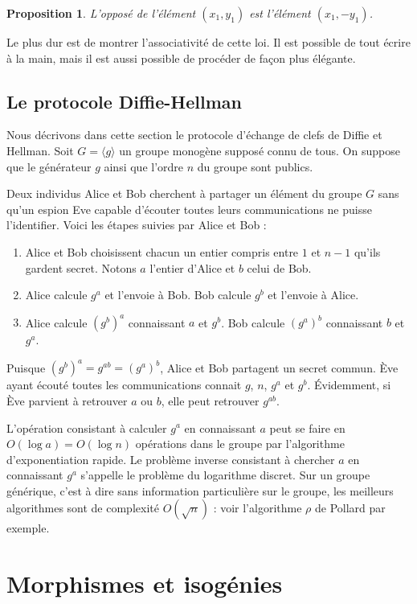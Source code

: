 \documentclass{article}
\theoremstyle{plain}%
\newtheorem{prop}[thm]{Proposition}
\theoremstyle{definition}%
\begin{document}
\begin{prop}
  \label{opposé}
L'opposé de l'élément $(x_1, y_1)$ est l'élément $(x_1, -y_1)$.
\end{prop}

Le plus dur est de montrer l'associativité de cette loi. Il est possible de tout écrire à la main, mais il est aussi possible de procéder de façon plus élégante.


\subsection{Le protocole Diffie-Hellman}


Nous décrivons dans cette section le protocole d'échange de clefs de Diffie et Hellman. 
Soit $G = \langle g \rangle$ un groupe monogène supposé connu de tous. On suppose que le générateur $g$ ainsi que l'ordre $n$ du groupe sont publics.

Deux individus Alice et Bob cherchent à partager un élément du groupe $G$ sans qu'un espion Eve capable d'écouter toutes leurs communications ne puisse l'identifier. Voici les étapes suivies par Alice et Bob :
\begin{enumerate}
  \item Alice et Bob choisissent chacun un entier compris entre $1$ et $n-1$ qu'ils gardent secret. Notons $a$ l'entier d'Alice et $b$ celui de Bob.
  \item Alice calcule $g^a$ et l'envoie à Bob. Bob calcule $g^b$ et l'envoie à Alice.
  \item Alice calcule $(g^b)^a$ connaissant $a$ et $g^b$. Bob calcule $(g^a)^b$ connaissant $b$ et $g^a$.
\end{enumerate}
Puisque $(g^b)^a = g^{ab} = (g^a)^b$, Alice et Bob partagent un secret commun. Ève ayant écouté toutes les communications connait $g$, $n$, $g^a$ et $g^b$. Évidemment, si Ève parvient à retrouver $a$ ou $b$, elle peut retrouver $g^{ab}$. 

L'opération consistant à calculer $g^a$ en connaissant $a$ peut se faire en $O(\log a) = O(\log n)$ opérations dans le groupe par l'algorithme d'exponentiation rapide. Le problème inverse consistant à chercher $a$ en connaissant $g^a$ s'appelle le problème du logarithme discret. Sur un groupe générique, c'est à dire sans information particulière sur le groupe, les meilleurs algorithmes sont de complexité $O(\sqrt{n})$ : voir l'algorithme $\rho$ de Pollard par exemple.



\section{Morphismes et isogénies}
\end{document}
